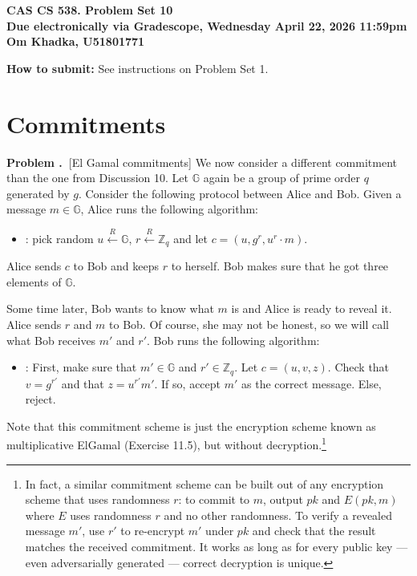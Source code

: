 \documentclass[12pt]{article}
\newif\ifsol
\theoremstyle{definition}
\newcommand{\addbigskip}{\addvspace{\bigskipamount}}
\newcounter{problemnum}
\newenvironment{problem}
     {\addbigskip \setcounter{partnum}{0}
      \noindent\stepcounter{problemnum}\textbf{Problem
                                             \arabic{problemnum}.\ }}
     {\par\addbigskip}
\newcounter{partnum}
\newcommand{\Z}{\mathbb{Z}}
\newcommand{\G}{\mathbb{G}}
\newcommand{\pk}{\mathit{pk}}
\newcommand{\samples}{\xleftarrow{R}}
\begin{document}
\begin{center}
\Large{\textbf{CAS CS 538.  \ifsol Solutions to \fi Problem Set 10}}\\
\smallskip
\large{\textbf{Due electronically via Gradescope, Wednesday April 22, 2026 11:59pm}}\\
\large{\textbf{Om Khadka, U51801771}}
\end{center}

\noindent
\textbf{How to submit:}  See instructions on Problem Set 1. 
 
\section{Commitments}


\begin{problem}[El Gamal commitments]
    We now consider a different commitment than the one from Discussion 10. 
    Let $\G$ again be a group of prime order $q$ generated by $g$. 
    Consider the following protocol between Alice and Bob. 
    Given a message $m\in \G$, Alice runs the following algorithm:
    \begin{itemize}
        \item \underline{}: pick random $u\samples \G$,  $r\samples \Z_q$ and let $c=(u, g^r, u^r \cdot m)$.
    \end{itemize}
    Alice sends $c$ to Bob and keeps $r$ to herself.
    Bob makes sure that he got three elements of $\G$.
    
    Some time later, Bob wants to know what $m$ is and Alice is ready to reveal it.
    Alice sends $r$ and $m$ to Bob.
    Of course, she may not be honest, so we will call what Bob receives $m'$ and $r'$.
    Bob runs the following algorithm:
    \begin{itemize}
        \item \underline{}: 
        First, make sure that $m' \in \G$ and $r' \in \Z_q$. 
        Let $c=(u, v, z)$. Check that $v=g^{r'}$ and that $z=u^{r'} m'$. 
        If so, accept $m'$ as the correct message. Else, reject.
    \end{itemize}
    Note that this commitment scheme is just the encryption scheme known as 
    multiplicative ElGamal (Exercise 11.5), but without decryption.\footnote{
    In fact, a similar commitment scheme can be built out of any encryption 
    scheme that uses randomness $r$: to commit to $m$, output $\pk$ and $E(\pk, m)$ 
    where $E$ uses randomness $r$ and no other randomness. To verify a revealed 
    message $m'$, use $r'$ to re-encrypt $m'$ under $\pk$ and check that the result 
    matches the received commitment. It works as long as for every public key --- 
    even adversarially generated --- correct decryption is unique.}


\end{problem}
\end{document}
